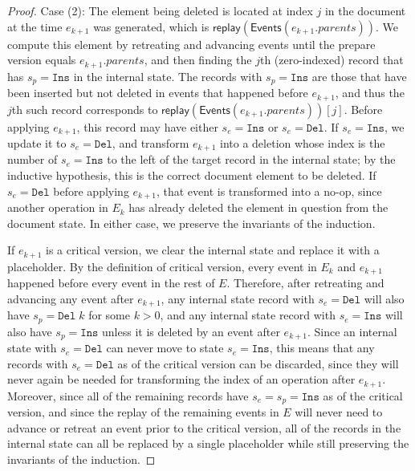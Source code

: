 \documentclass[sigplan,10pt]{acmart}
\begin{document}
\begin{proof}
  Case (2): The element being deleted is located at index $j$ in the document at the time $e_{k+1}$ was generated, which is $\mathsf{replay}(\mathsf{Events}(e_{k+1}.\mathit{parents}))$.
  We compute this element by retreating and advancing events until the prepare version equals $e_{k+1}.\mathit{parents}$, and then finding the $j$th (zero-indexed) record that has $s_p = \texttt{Ins}$ in the internal state.
  The records with $s_p = \texttt{Ins}$ are those that have been inserted but not deleted in events that happened before $e_{k+1}$, and thus the $j$th such record corresponds to $\mathsf{replay}(\mathsf{Events}(e_{k+1}.\mathit{parents}))[j]$.
  Before applying $e_{k+1}$, this record may have either $s_e = \texttt{Ins}$ or $s_e = \texttt{Del}$.
  If $s_e = \texttt{Ins}$, we update it to $s_e = \texttt{Del}$, and transform $e_{k+1}$ into a deletion whose index is the number of $s_e = \texttt{Ins}$ to the left of the target record in the internal state; by the inductive hypothesis, this is the correct document element to be deleted.
  If $s_e = \texttt{Del}$ before applying $e_{k+1}$, that event is transformed into a no-op, since another operation in $E_k$ has already deleted the element in question from the document state.
  In either case, we preserve the invariants of the induction.

  If $e_{k+1}$ is a critical version, we clear the internal state and replace it with a placeholder.
  By the definition of critical version, every event in $E_k$ and $e_{k+1}$ happened before every event in the rest of $E$.
  Therefore, after retreating and advancing any event after $e_{k+1}$, any internal state record with $s_e = \texttt{Del}$ will also have $s_p = \texttt{Del}\; k$ for some $k>0$, and any internal state record with $s_e = \texttt{Ins}$ will also have $s_p = \texttt{Ins}$ unless it is deleted by an event after $e_{k+1}$.
  Since an internal state with $s_e = \texttt{Del}$ can never move to state $s_e = \texttt{Ins}$, this means that any records with $s_e = \texttt{Del}$ as of the critical version can be discarded, since they will never again be needed for transforming the index of an operation after $e_{k+1}$.
  Moreover, since all of the remaining records have $s_e = s_p = \texttt{Ins}$ as of the critical version, and since the replay of the remaining events in $E$ will never need to advance or retreat an event prior to the critical version, all of the records in the internal state can all be replaced by a single placeholder while still preserving the invariants of the induction.
\end{proof}
\end{document}
